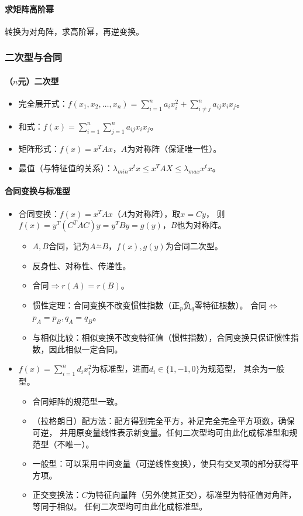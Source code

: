 \documentclass[
12pt, %
a4paper, 
oneside, %
headinclude,footinclude, %
]{scrartcl}
\begin{document}
\paragraph{求矩阵高阶幂}
转换为对角阵，求高阶幂，再逆变换。
\subsubsection{二次型与合同}
\paragraph{（$ n $元）二次型}
\begin{itemize}
\item 完全展开式：$ f(x_1, x_2, \dots, x_n) = \sum_{i = 1}^n a_ix_i^2 + \sum_{i \neq j}^n a_{ij}x_ix_j $。
\item 和式：$ f(x) = \sum_{i = 1}^n\sum_{j = 1}^n a_{ij}x_ix_j $。
\item 矩阵形式：$ f(x) = x^TAx $，$ A $为对称阵（保证唯一性）。
\item 最值（与特征值的关系）：$ \lambda_{min}x^tx \leq x^TAX \leq \lambda_{max}x^tx $。
\end{itemize}
\paragraph{合同变换与标准型}
\begin{itemize}
\item 合同变换：$ f(x) = x^TAx $（$ A $为对称阵），取$ x = Cy $，
则$ f(x) = y^T(C^TAC)y = y^TBy = g(y) $，$ B $也为对称阵。
\begin{itemize}
\item $ A,B $合同，记为$ A \overset{\sim}{-} B $，$ f(x),g(y) $为合同二次型。
\item 反身性、对称性、传递性。
\item 合同$ \Rightarrow $$ r(A) = r(B) $。
\item 惯性定理：合同变换不改变惯性指数（正$ _p $负$ _q $零特征根数）。
合同$ \Leftrightarrow $$ p_A = p_B, q_A = q_B $。
\item 与相似比较：相似变换不改变特征值（惯性指数），合同变换只保证惯性指数，因此相似一定合同。
\end{itemize}
\item $ f(x) = \sum_{i = 1}^n d_ix_i^2 $为标准型，进而$ d_i \in \{1, -1, 0\} $为规范型，
其余为一般型。
\begin{itemize}
\item 合同矩阵的规范型一致。
\item （拉格朗日）配方法：配方得到完全平方，补足完全完全平方项数，确保可逆，
并用原变量线性表示新变量。任何二次型均可由此化成标准型和规范型（不唯一）。
\item 一般型：可以采用中间变量（可逆线性变换），使只有交叉项的部分获得平方项。
\item 正交变换法：$ C $为特征向量阵（另外使其正交），标准型为特征值对角阵，等同于相似。
任何二次型均可由此化成标准型。
\end{itemize}
\end{itemize}
\end{document}
